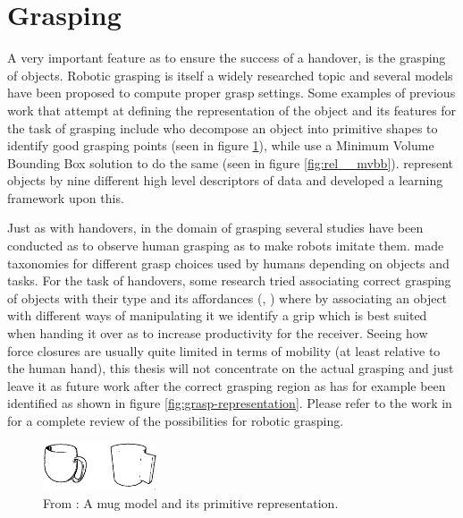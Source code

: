 \section{Grasping}
\label{sec:rel_grasping}
A very important feature as to ensure the success of a handover, is the grasping of objects. Robotic grasping is itself a widely researched topic and several models have been proposed to compute proper grasp settings. Some examples of previous work that attempt at defining the representation of the object and its features for the task of grasping include \textcite{Miller2003} who decompose an object into primitive shapes to identify good grasping points (seen in figure \ref{fig:rel__shape-primitives}), while \textcite{Huebner2008} use a Minimum Volume Bounding Box solution to do the same (seen in figure \ref{fig:rel__mvbb}). \textcite{Morales} represent objects by nine different high level descriptors of data and developed a learning framework upon this.

Just as with handovers, in the domain of grasping several studies have been conducted as to observe human grasping as to make robots imitate them. \parencite{Cutkosky1990} \parencite{Feix2009} \parencite{Kang1993} made taxonomies for different grasp choices used by humans depending on objects and tasks. For the task of handovers, some research tried associating correct grasping of objects with their type and its affordances (\parencite{Song2015}, \parencite{Chan2014}) where by associating an object with different ways of manipulating it we identify a grip which is best suited when handing it over as to increase productivity for the receiver. Seeing how force closures are usually quite limited in terms of mobility (at least relative to the human hand), this thesis will not concentrate on the actual grasping and just leave it as future work after the correct grasping region as has for example been identified as shown in figure \ref{fig:grasp-representation}. Please refer to the work in \parencite{Sahbani2012} for a complete review of the possibilities for robotic grasping.

\begin{figure}
	\centering
	\includegraphics[width=0.3\textwidth]{img/related-work/shape-primitives.png}
	\caption{From \parencite{Miller2003}: A mug model and its primitive representation.}
	\label{fig:rel__shape-primitives}
\end{figure}

